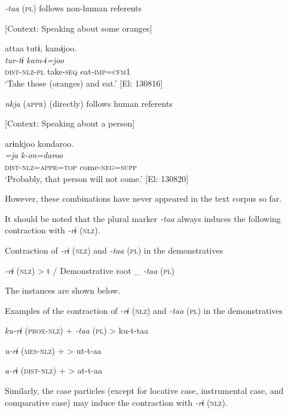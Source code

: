  \ex \label{ex:5:b} \textit{{}-taa} (\textsc{pl}) follows non-human referents

    [Context: Speaking about some oranges]

\glll  attaa  tutɨ,  kamɨjoo.\\
\textit{}  \textit{tur-tɨ}  \textit{kam-ɨ=joo}\\
\textsc{dist}-\textsc{nlz}-\textsc{pl}  take-\textsc{seq}  eat-\textsc{imp}=\textsc{cfm}1\\
\glt ‘Take those (oranges) and eat.’ [El: 130816]

 \ex \label{ex:5:c} \textit{nkja} (\textsc{appr}) (directly) follows human referents

    [Context: Speaking about a person]

\glll  arɨnkjoo  kondaroo.\\
\textit{=ja}  \textit{k-on=daroo}\\
\textsc{dist}-\textsc{nlz}=\textsc{appr}=\textsc{top}  come-\textsc{neg}=\textsc{supp}\\
\glt ‘Probably, that person will not come.’ [El: 130820]
\z
\z

However, these combinations have never appeared in the text corpus so far.

It should be noted that the plural marker \textit{{}-taa} always induces the following contraction with \textit{{}-rɨ} (\textsc{nlz}).

\ea \label{ex:5:18}   Contraction of \textit{{}-rɨ} (\textsc{nlz}) and \textit{{}-taa} (\textsc{pl}) in the demonstratives

  \textit{{}-rɨ} (\textsc{nlz})  >  t  /  Demonstrative root  \_  \textit{{}-taa} (\textsc{pl})
\z

The instances are shown below.

\ea \label{ex:5:19}   Examples of the contraction of \textit{{}-rɨ} (\textsc{nlz}) and \textit{{}-taa} (\textsc{pl}) in the demonstratives

  \textit{ku-rɨ}  (\textsc{prox}-\textsc{nlz})  +  \textit{{}-taa} (\textsc{pl})  >  ku-t-taa

  \textit{u-rɨ}  (\textsc{mes}-\textsc{nlz})  +      >  ut-t-aa

  \textit{a-rɨ}  (\textsc{dist}-\textsc{nlz})  +      >  at-t-aa
\z

Similarly, the case particles (except for locative case, instrumental case, and comparative case) may induce the contraction with \textit{{}-rɨ} (\textsc{nlz}).

